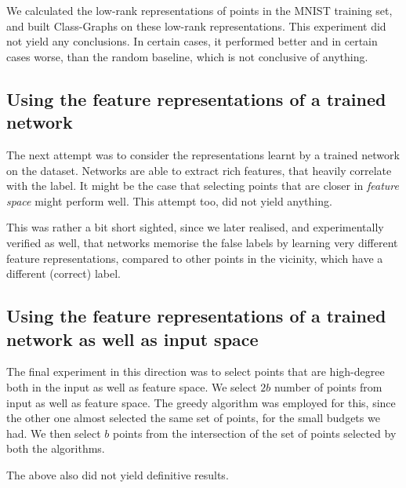 \documentclass{ociamthesis}
\begin{document}
We calculated the low-rank representations of points in the MNIST training set,
and built Class-Graphs on these low-rank representations. This experiment did
not yield any conclusions. In certain cases, it performed better and in certain
cases worse, than the random baseline, which is not conclusive of anything.

\subsection{Using the feature representations of a trained network}
The next attempt was to consider the representations learnt by a trained network
on the dataset. Networks are able to extract rich features, that heavily
correlate with the label. It might be the case that selecting points that are
closer in \emph{feature space} might perform well. This attempt too, did not
yield anything.

This was rather a bit short sighted, since we later realised, and experimentally
verified as well, that networks memorise the false labels by learning very
different feature representations, compared to other points in the vicinity,
which have a different (correct) label.


\subsection{Using the feature representations of a trained network as well as input space}

The final experiment in this direction was to select points that are high-degree
both in the input as well as feature space. We select $2b$ number of points from
input as well as feature space. The greedy algorithm was employed for this,
since the other one almost selected the same set of points, for the small
budgets we had. We then select $b$ points from the intersection of the set of
points selected by both the algorithms.

The above also did not yield definitive results.
\end{document}
